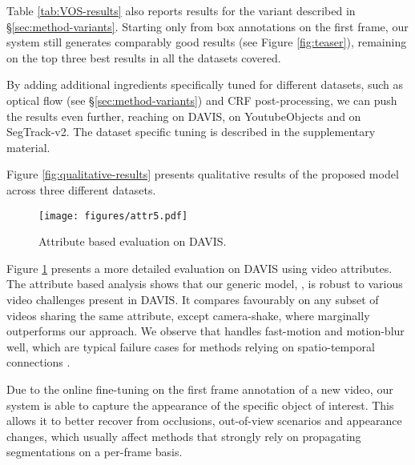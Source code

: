 \documentclass[10pt,twocolumn,letterpaper]{article}
\makeatletter
\renewcommand{\paragraph}{\@startsection{paragraph}{4}{\z@}{0.5ex \@plus 1ex \@minus .2ex}{-0.5em}{\normalfont \normalsize \bfseries}}
\newcommand{\segtrack}{SegTrack-v2}
\makeatother
\begin{document}
Table \ref{tab:VOS-results} also reports results for the  variant described in \S\ref{sec:method-variants}.
Starting only from box annotations on the first frame, our system still generates comparably good results (see Figure \ref{fig:teaser}), remaining on the top three best results in all the datasets covered.

By adding additional ingredients specifically tuned for different datasets, such as optical flow (see \S\ref{sec:method-variants}) and CRF post-processing, we can push the results even further, reaching
 on DAVIS,  on YoutubeObjects and   on \segtrack{}. The dataset specific tuning is described in the supplementary material.

Figure \ref{fig:qualitative-results} presents qualitative results of the proposed  model across three different datasets.




\begin{figure}
\begin{centering}
\texttt{[image: figures/attr5.pdf]}
\par\end{centering}
\caption{\label{fig:attribute_analysis} Attribute based evaluation on DAVIS.}
\end{figure}




\paragraph{Attribute-based analysis}
Figure \ref{fig:attribute_analysis} presents a more detailed evaluation on DAVIS \cite{Perazzi2016Cvpr} using video attributes.
The attribute based analysis shows that our generic model, ,
is robust to various video challenges present in DAVIS. It compares favourably on any subset of videos sharing the same attribute, except camera-shake, where  \cite{Tsai2016Cvpr} marginally outperforms our approach.
We observe that  handles fast-motion and motion-blur well, which are
typical failure cases for methods relying on spatio-temporal connections
\cite{Maerki2016Cvpr, Tsai2016Cvpr}.

Due to the online fine-tuning on the first frame annotation of a new video, our system is able to capture the appearance of the specific object of interest. 
This allows it to better recover from occlusions, out-of-view scenarios and appearance changes, which usually affect methods that strongly rely on propagating segmentations on a per-frame basis.
\end{document}
